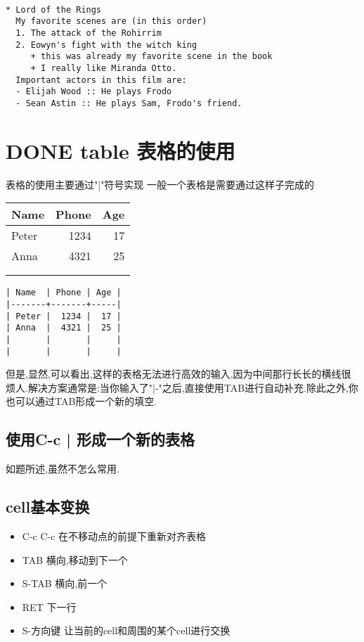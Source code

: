 \documentclass[10pt,a4paper]{article}
\begin{document}
\begin{verbatim}

* Lord of the Rings
  My favorite scenes are (in this order)
  1. The attack of the Rohirrim
  2. Eowyn's fight with the witch king
     + this was already my favorite scene in the book
     + I really like Miranda Otto.
  Important actors in this film are:
  - Elijah Wood :: He plays Frodo
  - Sean Astin :: He plays Sam, Frodo's friend.

\end{verbatim}
\section{{\bfseries\sffamily DONE} table 表格的使用}
\label{sec:org6479a10}
表格的使用主要通过"|"符号实现
一般一个表格是需要通过这样子完成的
\begin{center}
\begin{tabular}{lrr}
Name & Phone & Age\\
\hline
Peter & 1234 & 17\\
Anna & 4321 & 25\\
 &  & \\
 &  & \\
\end{tabular}
\end{center}

\begin{verbatim}
| Name  | Phone | Age |
|-------+-------+-----|
| Peter |  1234 |  17 |
| Anna  |  4321 |  25 |
|       |       |     |
|       |       |     |

\end{verbatim}

但是,显然,可以看出,这样的表格无法进行高效的输入,因为中间那行长长的横线很烦人.解决方案通常是:当你输入了"|-"之后,直接使用TAB进行自动补充.除此之外,你也可以通过TAB形成一个新的填空.
\subsection{使用C-c | 形成一个新的表格}
\label{sec:org14200f8}
如题所述,虽然不怎么常用.
\subsection{cell基本变换}
\label{sec:orga08ba6c}
\begin{itemize}
\item C-c C-c 在不移动点的前提下重新对齐表格
\item TAB 横向,移动到下一个
\item S-TAB 横向,前一个
\item RET 下一行
\item S-方向键 让当前的cell和周围的某个cell进行交换
\end{itemize}
\end{document}
